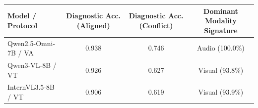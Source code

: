 \begin{tabular}{lccc}
\toprule
Model / Protocol & Diagnostic Acc. (Aligned) & Diagnostic Acc. (Conflict) & Dominant Modality Signature \\
\midrule
Qwen2.5-Omni-7B / VA & 0.938 & 0.746 & Audio (100.0\%) \\
Qwen3-VL-8B / VT & 0.926 & 0.627 & Visual (93.8\%) \\
InternVL3.5-8B / VT & 0.906 & 0.619 & Visual (93.9\%) \\
\bottomrule
\end{tabular}
